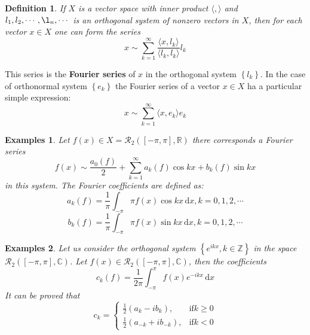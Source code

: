 \documentclass[a4paper,12pt]{article}
\newtheorem{definition}{Definition}[section]
\newtheorem{example}{Examples}
\begin{document}
    \begin{definition}
        If $X$ is a vector space with inner product $\langle, \rangle$ 
        and $\displaystyle l_1, l_2, \cdots, \l_n, \cdots$ is an 
        orthogonal system of nonzero vectors in $X$, then for each 
        vector $x \in X$ one can form the series 
        \begin{equation}
            x \sim \sum_{k=1}^{\infty} \frac{\langle x, l_k \rangle}
            {\langle l_k, l_k \rangle}l_k
            \label{eq:eq6}
        \end{equation}
    \end{definition}
    
    This series is the \textbf{Fourier series} of $x$ in the orthogonal 
    system $\left\{l_k\right\}$. In the case of orthonormal system 
    $\displaystyle \left\{e_k\right\}$ the Fourier series of a vector 
    $x \in X$ ha a particular simple expression:
    \begin{equation}
        x \sim \sum_{k=1}^{\infty} \langle x, e_k \rangle e_k
        \label{eq:eq7}
    \end{equation}

    \begin{example}
        Let $f(x) \in X = \mathcal{R}_2([-\pi, \pi], \mathbb{R})$ 
        there corresponds a Fourier series 
        \[
            f(x) \sim \frac{a_0(f)}{2} + \sum_{k=1}^{\infty}a_k(f)\cos kx 
                               + b_k(f)\sin kx 
        \]
        in this system. The Fourier coefficients are defined as:
        \begin{equation}
            a_k(f) = \frac{1}{\pi}\int_{-\pi}{\pi}f(x)\cos kx\, 
            \mathrm{d}x, k = 0, 1, 2, \cdots
            \label{eq:eq8}
        \end{equation}
        \begin{equation}
            b_k(f) = \frac{1}{\pi}\int_{-\pi}{\pi}f(x)\sin kx\, 
            \mathrm{d}x, k = 0, 1, 2, \cdots
            \label{eq:eq9}
        \end{equation}
    \end{example}

    \begin{example}
        Let us consider the orthogonal system $\displaystyle \left\{
            e^{ikx}, k \in \mathbb{Z}\right\}$ in the space 
        $\displaystyle \mathcal{R}_2([-\pi, \pi], \mathbb{C})$.
        Let $\displaystyle f(x) \in \mathcal{R}_2([-\pi, \pi], \mathbb{C})$, 
        then the coefficients 
        \[
            c_k(f) = \frac{1}{2\pi}\int_{-\pi}^{\pi} f(x)e^{-ikx}\,
            \mathrm{d}x
        \]
        It can be proved that 
        \begin{equation}
            c_k = \left\{ \begin{array}{cc} 
            \frac{1}{2}(a_k - ib_k), & \mathrm{ if } k \ge 0 \\
            \frac{1}{2}(a_{-k} + ib_{-k}), & \mathrm{ if } k < 0 
            \end{array}\right.
        \end{equation}
    \end{example}
\end{document}
